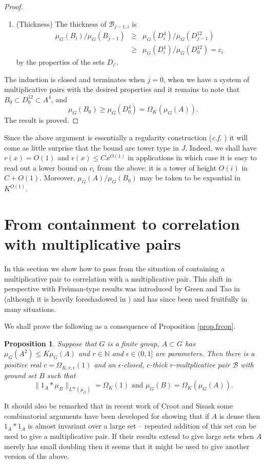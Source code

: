 \documentclass[12pt]{amsart}
\numberwithin{equation}{section}
\theoremstyle{plain}
\newtheorem{proposition}[subsection]{Proposition}
\theoremstyle{definition}
\renewcommand{\leq}{\leqslant}
\renewcommand{\geq}{\geqslant}
\newcommand{\N}{\mathbb{N}}
\begin{document}
\begin{proof}
\begin{enumerate}
\item (Thickness) The thickness of $\mathcal{B}_{j-1,i}$ is
\begin{eqnarray*}
\mu_G(B_i)/\mu_G(B_{j-1})& \geq& \mu_G(D_i^4)/\mu_G(D_{j-1}^{12}) \\ &\geq & \mu_G(D_i^4)/\mu_G(D_0^{12}) = c_i
\end{eqnarray*}
by the properties of the sets $D_{i'}$.
\end{enumerate}
The induction is closed and terminates when $j=0$, when we have a system of multiplicative pairs with the desired properties and it remains to note that $B_0 \subset D_0^{12}\subset A^4$, and 
\begin{equation*}
\mu_G(B_0) \geq \mu_G(D_0^4) = \Omega_K(\mu_G(A)).
\end{equation*}
The result is proved.
\end{proof}
Since the above argument is essentially a regularity construction (\emph{c.f.} \cite{TCTReg}) it will come as little surprise that the bound are tower type in $J$.  Indeed, we shall have $r(x) = O(1)$ and $\epsilon(x)\leq Cx^{O(1)}$ in applications in which case it is easy to read out a lower bound on $c_i$ from the above: it is a tower of height $O(i)$ in $C+O(1)$.  Moreover, $\mu_G(A)/\mu_G(B_0)$ may be taken to be expontial in $K^{O(1)}$.

\section{From containment to correlation with multiplicative pairs}\label{sec.containment}

In this section we show how to pass from the situation of containing a multiplicative pair to correlation with a multiplicative pair.  This shift in perspective with Fre{\u\i}man-type results was introduced by Green and Tao in \cite{BJGTCTF} (although it is heavily foreshadowed in \cite{WTG}) and has since been used fruitfully in many situations.  

We shall prove the following as a consequence of Proposition \ref{prop.frcon}.
\begin{proposition}\label{prop.wkfr}
Suppose that $G$ is a finite group, $A \subset G$ has $\mu_G(A^2) \leq K\mu_G(A)$ and $r \in \N$ and $\epsilon \in (0,1]$ are parameters.  Then there is a positive real $c=\Omega_{K,r,\epsilon}(1)$ and an $\epsilon$-closed, $c$-thick $r$-multplicative pair $\mathcal{B}$ with ground set $B$ such that
\begin{equation*}
\|1_A \ast \mu_B\|_{L^\infty(\mu_G)} = \Omega_K(1) \textrm{ and } \mu_G(B)= \Omega_K(\mu_G(A)).
\end{equation*}
\end{proposition}
It should also be remarked that in recent work of Croot and Sisask \cite{ESCOS} some combinatorial arguments have been developed for showing that if $A$ is dense then $1_A \ast 1_A$ is almost invariant over a large set -- repeated addition of this set can be used to give a multiplicative pair.  If their results extend to give large sets when $A$ merely has small doubling then it seems that it might be used to give another version of the above.
\end{document}
